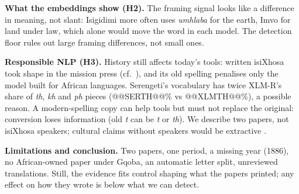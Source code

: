 \documentclass[10pt,letterpaper]{article}
\begin{document}
\textbf{What the embeddings show (H2).} The framing signal looks like a difference in meaning, not slant: Isigidimi more often uses \emph{umhlaba} for the earth, Imvo for land under law, which alone would move the word in each model. The detection floor rules out large framing differences, not small ones.

\textbf{Responsible NLP (H3).} History still affects today's tools: written isiXhosa took shape in the mission press (cf.\ \citealp{gilmour2007}), and its old spelling penalises only the model built for African languages. Serengeti's vocabulary has twice XLM-R's share of \emph{th}, \emph{kh} and \emph{ph} pieces (@@SERTH@@\% vs @@XLMTH@@\%), a possible reason. A modern-spelling copy can help tools but must not replace the original: conversion loses information (old \emph{t} can be \emph{t} or \emph{th}). We describe two papers, not isiXhosa speakers; cultural claims without speakers would be extractive \citep{bird2020}.

\textbf{Limitations and conclusion.} Two papers, one period, a missing year (1886), no African-owned paper under Gqoba, an automatic letter split, unreviewed translations. Still, the evidence fits control shaping what the papers printed; any effect on how they wrote is below what we can detect.


\setlength{\bibleftmargin}{.125in}
\setlength{\bibindent}{-\bibleftmargin}


\clearpage
\onecolumn
\small



\end{document}
